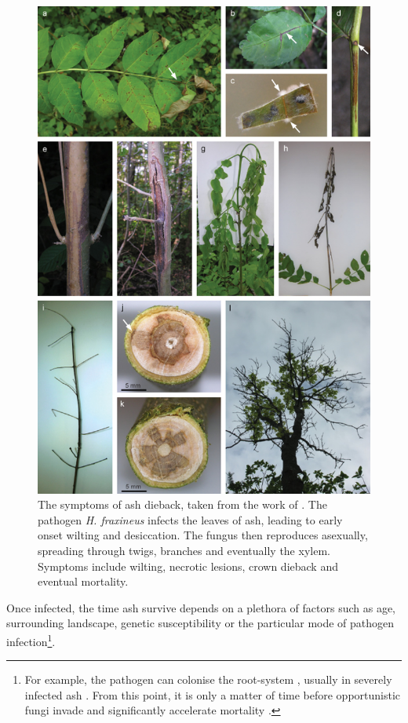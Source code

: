 
\begin{figure}
    \centering
    \includegraphics[scale=0.5]{chapter2/figures/gross2014.jpg}
    \caption{The symptoms of ash dieback, taken from the work of \cite{gross2014h}. The pathogen \textit{H. fraxineus} infects the leaves of ash, leading to early onset wilting and desiccation. The fungus then reproduces asexually, spreading through twigs, branches and eventually the xylem. Symptoms include wilting, necrotic lesions, crown dieback and eventual mortality.}
    \label{fig:my_label}
\end{figure}
 Once infected, the time ash survive depends on a plethora of factors such as age, surrounding landscape, genetic susceptibility or the particular mode of pathogen infection\footnote{For example, the pathogen can colonise the root-system \cite{schumacher2011general}, usually in severely infected ash \cite{https://doi.org/10.1111/mpp.12073}. From this point, it is only a matter of time before opportunistic fungi invade and significantly accelerate mortality \cite{enderle2013temporal}.}. 
 
